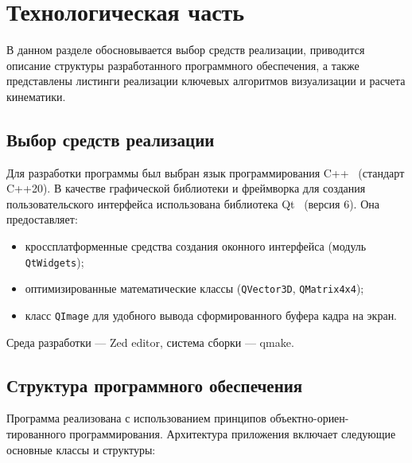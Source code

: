 \section{Технологическая часть}

В данном разделе обосновывается выбор средств реализации, приводится описание структуры разработанного программного обеспечения, а также представлены листинги реализации ключевых алгоритмов визуализации и расчета кинематики.

\subsection{Выбор средств реализации}

Для разработки программы был выбран язык программирования C++~\cite{cpp_ref} (стандарт C++20). В качестве графической библиотеки и фреймворка для создания пользовательского интерфейса использована библиотека Qt~\cite{qt_doc} (версия 6). Она предоставляет:
\begin{itemize}
	\item кроссплатформенные средства создания оконного интерфейса (модуль \texttt{QtWidgets});
	\item оптимизированные математические классы (\texttt{QVector3D}, \texttt{QMatrix4x4});
	\item класс \texttt{QImage} для удобного вывода сформированного буфера кадра на экран.
\end{itemize}

Среда разработки --- Zed editor, система сборки --- qmake.

\subsection{Структура программного обеспечения}

Программа реализована с использованием принципов объектно-ориен-тированного программирования. Архитектура приложения включает следующие основные классы и структуры:

